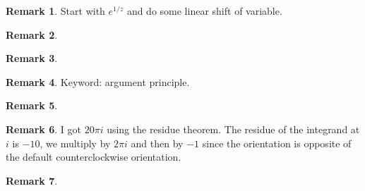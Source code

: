 \documentclass[11pt,oneside]{amsart}
\theoremstyle{definition}
\newtheorem{remark}{Remark}
\begin{document}
\begin{remark} %
  Start with $e^{1/z}$ and do some linear shift of variable.
\end{remark}

\begin{remark} %
  
\end{remark}

\begin{remark} %
  
\end{remark}

\begin{remark} %
  Keyword: argument principle.
\end{remark}

\begin{remark} %
\end{remark}

\begin{remark}
  I got $20\pi i$ using the residue theorem. The residue of the integrand at $i$ is $-10$, we multiply by $2\pi i$ and then by $-1$ since the orientation is opposite of the default counterclockwise orientation.
\end{remark}

\begin{remark}
  
\end{remark}
\end{document}
